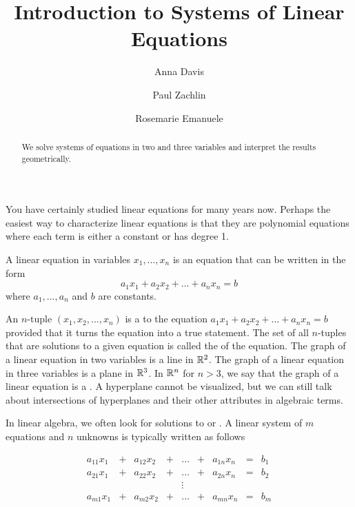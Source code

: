 \documentclass{ximera}
\author{Anna Davis \and Paul Zachlin \and Rosemarie Emanuele} \title{Introduction to Systems of Linear Equations} \license{CC-BY 4.0}
\begin{document}
\begin{abstract}
 We solve systems of equations in two and three variables and interpret the results geometrically.
\end{abstract}
\maketitle

You have certainly studied linear equations for many years now.  Perhaps the easiest way to characterize linear equations is that they are polynomial equations where each term is either a constant or has degree 1.

\begin{definition}
A linear equation in variables $x_1, \ldots, x_n$ is an equation that can be written in the form
$$a_1x_1+a_2x_2+\ldots +a_nx_n=b$$
where $a_1,\ldots ,a_n$ and $b$ are constants.
\end{definition}




An $n$-tuple $(x_1, x_2,\ldots ,x_n)$ is a  to the equation $a_1x_1+a_2x_2+\ldots +a_nx_n=b$ provided that it turns the equation into a true statement.  The set of all $n$-tuples that are solutions to a given equation is called the  of the equation. The graph of a linear equation in two variables is a line in $\mathbb{R}^2$.  The graph of a linear equation in three variables is a plane in $\mathbb{R}^3$.  In $\mathbb{R}^n$ for $n>3$, we say that the graph of a linear equation is a . A hyperplane cannot be visualized, but we can still talk about intersections of hyperplanes and their other attributes in algebraic terms.  

In linear algebra, we often look for solutions to  or .  
A linear system of $m$ equations and $n$ unknowns is typically written as follows

$$\begin{array}{ccccccccc}
      a_{11}x_1 &+ &a_{12}x_2&+&\ldots&+&a_{1n}x_n&= &b_1 \\
	 a_{21}x_1 &+ &a_{22}x_2&+&\ldots&+&a_{2n}x_n&= &b_2 \\
     &&&&\vdots&&&& \\
     a_{m1}x_1 &+ &a_{m2}x_2&+&\ldots&+&a_{mn}x_n&= &b_m
    \end{array}$$
\end{document}
